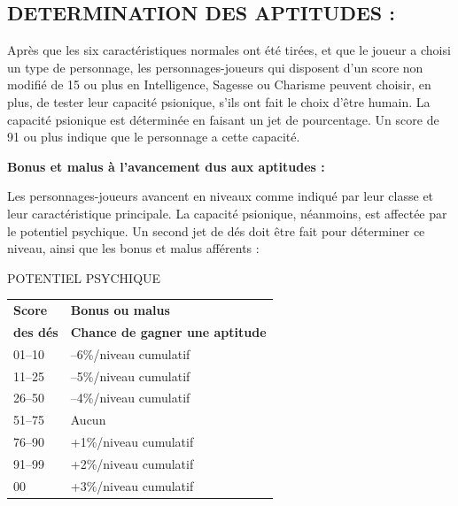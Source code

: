 \documentclass[11pt]{article}
\begin{document}
{%
\subsection*{\normalsize DETERMINATION DES APTITUDES :}

\medskip

Après que les six caractéristiques normales ont été tirées, et que le joueur a choisi un type de personnage, les personnages-joueurs qui disposent d'un score non modifié de 15 ou plus en Intelligence, Sagesse ou Charisme peuvent choisir, en plus, de tester leur capacité psionique, s'ils ont fait le choix d'être humain. La capacité psionique est déterminée en faisant un jet de pourcentage. Un score de 91 ou plus indique que le personnage a cette capacité.

\bigskip

\textbf{Bonus et malus à l'avancement dus aux aptitudes :}

\bigskip

Les personnages-joueurs avancent en niveaux comme indiqué par leur classe et leur caractéristique principale. La capacité psionique, néanmoins, est affectée par le potentiel psychique. Un second jet de dés doit être fait pour déterminer ce niveau, ainsi que les bonus et malus afférents :

\bigskip

{\parindent3cm POTENTIEL PSYCHIQUE

\bigskip

\begin{tabular}{p{3cm}l}
\textbf{Score} & \textbf{Bonus ou malus} \\
\textbf{des dés} & \textbf{Chance de gagner une aptitude} \\
01--10 & --6\%/niveau cumulatif \\
11--25 & --5\%/niveau cumulatif \\
26--50 & --4\%/niveau cumulatif \\
51--75 & Aucun \\
76--90 & +1\%/niveau cumulatif \\
91--99 & +2\%/niveau cumulatif \\
\hspace{0.4cm}00 & +3\%/niveau cumulatif \\
\end{tabular}}

\bigskip

}
\end{document}
